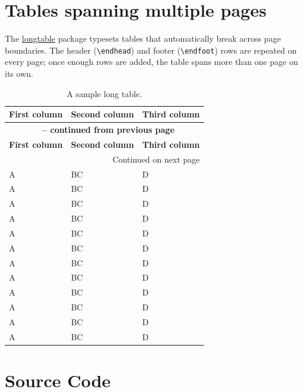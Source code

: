 \section{Tables spanning multiple pages}

The \href{https://ctan.org/pkg/longtable}{longtable} package typesets tables that automatically break across page boundaries.
The header (\verb+\endhead+) and footer (\verb+\endfoot+) rows are repeated on every page; once enough rows are added, the table spans more than one page on its own.

\begin{ltgexample}
\begin{longtable}{|l|l|l|}
  \caption{A sample long table.}\label{tab:long} \\
  \hline
  \multicolumn{1}{|c|}{\textbf{First column}} & \multicolumn{1}{c|}{\textbf{Second column}} & \multicolumn{1}{c|}{\textbf{Third column}} \\ \hline
  \endfirsthead

  \multicolumn{3}{c}{{\bfseries \tablename\ \thetable{} -- continued from previous page}} \\
  \hline
  \multicolumn{1}{|c|}{\textbf{First column}} & \multicolumn{1}{c|}{\textbf{Second column}} & \multicolumn{1}{c|}{\textbf{Third column}} \\ \hline
  \endhead

  \hline \multicolumn{3}{|r|}{{Continued on next page}} \\ \hline
  \endfoot

  \hline\hline
  \endlastfoot

  A & BC & D \\
  A & BC & D \\
  A & BC & D \\
  A & BC & D \\
  A & BC & D \\
  A & BC & D \\
  A & BC & D \\
  A & BC & D \\
  A & BC & D \\
  A & BC & D \\
  A & BC & D \\
  A & BC & D \\
\end{longtable}
\end{ltgexample}

\section{Source Code}

